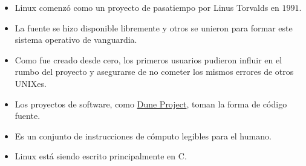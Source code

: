 
\begin{frame}
	\begin{itemize}
		\item

		      Linux comenzó como un proyecto de pasatiempo por Linus
		      Torvalds en $1991$.

		\item

		      La fuente se hizo disponible libremente y otros se unieron
		      para formar este sistema operativo de vanguardia.

		\item

		      Como fue creado desde cero, los primeros usuarios pudieron
		      influir en el rumbo del proyecto y asegurarse de no cometer
		      los mismos errores de otros UNIXes.

		\item

		      Los proyectos de software, como
		      \href{https://dune-project.org}{Dune Project}, toman la
		      forma de código fuente.

		\item
		      Es un conjunto de instrucciones de cómputo legibles
		      para el humano.

		\item

		      Linux está siendo escrito principalmente en C.
	\end{itemize}
\end{frame}

